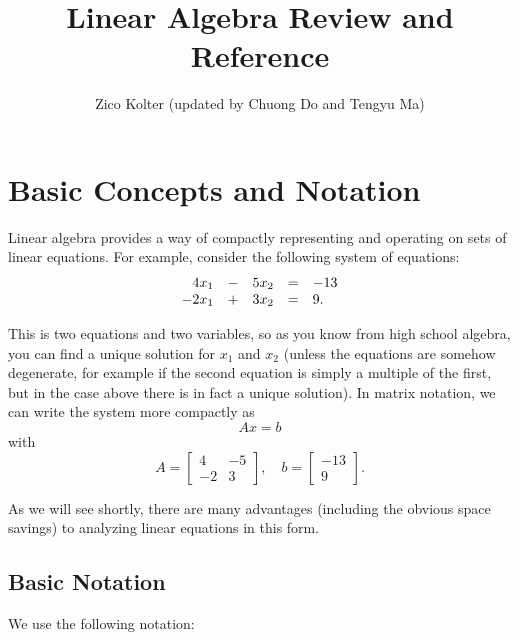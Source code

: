 \documentclass[12pt]{article}
\title{Linear Algebra Review and Reference}
\author{Zico Kolter (updated by Chuong Do and Tengyu Ma)}
\begin{document}
\maketitle
\tableofcontents

\section{Basic Concepts and Notation}
Linear algebra provides a way of compactly representing and operating
on sets of linear equations.  For example, consider the following
system of equations:
\[\begin{array}{rcrcl} 4 x_1 & - & 5 x_2 & = & -13 \\
-2 x_1 & + & 3 x_2 & = & 9. \end{array}\\ \]

This is two equations and two variables, so as you know from high
school algebra, you can find a unique solution for $x_1$ and $x_2$ (unless
the equations are somehow degenerate, for example if the second
equation is simply a multiple of the first, but in the case above
there is in fact a unique solution).  In matrix notation, we can write
the system more compactly as
\[Ax = b\]
with 
\[A = \left [ \begin{array}{cc} 4 & -5 \\ -2 & 3
  \end{array} \right ], \quad  b = \left [ \begin{array}{c} -13 \\
    9 \end{array} \right ]. \]

As we will see shortly, there are many advantages (including the
obvious space savings) to analyzing linear equations in this form.

\subsection{Basic Notation}

We use the following notation:
\end{document}
